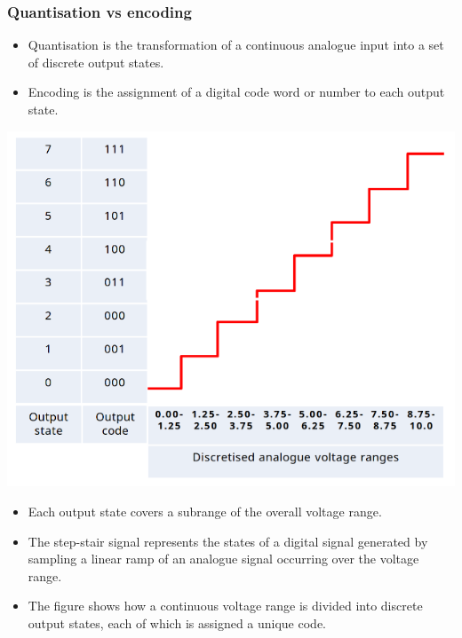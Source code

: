 \documentclass[11pt]{article}
\begin{document}
 \newpage
\subsubsection{Quantisation vs encoding}
\label{sec:orgbedc56e}
\begin{itemize}
\item Quantisation is the transformation of a continuous analogue input into a set of discrete output states.
\item Encoding is the assignment of a digital code word or number to each output state.
\end{itemize}

\begin{center}
\includegraphics[width=.9\linewidth]{./images/analogue-quantisation-size-graph.png}
\end{center}

\begin{itemize}
\item Each output state covers a subrange of the overall voltage range.
\item The step-stair signal represents the states of a digital signal generated by sampling a linear ramp of an analogue signal occurring over the voltage range.
\item The figure shows how a continuous voltage range is divided into discrete output states, each of which is assigned a unique code.
\end{itemize}

 \newpage
\end{document}
